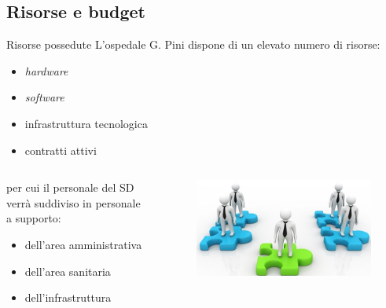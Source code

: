 \subsection*{Risorse e budget}
\begin{frame}{Risorse possedute}
L'ospedale G. Pini dispone di un elevato numero di risorse:
\begin{itemize}
\item{\textit{hardware}}
\item{\textit{software}}
\item{infrastruttura tecnologica}
\item{contratti attivi}
\end{itemize}
\vspace{5mm}
\begin{columns}
\begin{column}{0.7\textwidth}
per cui il personale del SD verrà suddiviso in personale a supporto:
\begin{itemize}
\item{dell'area amministrativa}
\item{dell'area sanitaria}
\item{dell'infrastruttura}
\end{itemize}
\end{column}
\begin{column}{0.3\textwidth}
\begin{figure}
\includegraphics[scale=0.15]{Images/Categories.png}
\end{figure}
\end{column}
\end{columns}
\end{frame}


